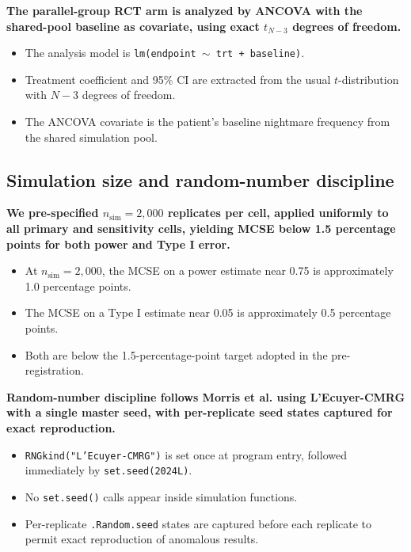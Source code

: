 \documentclass[
  11pt,
]{article}
\begin{document}
\textbf{The parallel-group RCT arm is analyzed by ANCOVA with the shared-pool baseline as covariate, using exact $t_{N-3}$ degrees of freedom.}

\begin{itemize}\setlength{\itemsep}{2pt}\setlength{\parskip}{0pt}
\item The analysis model is \texttt{lm(endpoint $\sim$ trt + baseline)}.
\item Treatment coefficient and 95\% CI are extracted from the usual $t$-distribution with $N - 3$ degrees of freedom.
\item The ANCOVA covariate is the patient's baseline nightmare frequency from the shared simulation pool.
\end{itemize}

\subsection{Simulation size and random-number discipline}\label{simulation-size-and-random-number-discipline}

\textbf{We pre-specified $n_{\text{sim}} = 2{,}000$ replicates per cell, applied uniformly to all primary and sensitivity cells, yielding MCSE below 1.5 percentage points for both power and Type I error.}

\begin{itemize}\setlength{\itemsep}{2pt}\setlength{\parskip}{0pt}
\item At $n_{\text{sim}} = 2{,}000$, the MCSE on a power estimate near 0.75 is approximately 1.0 percentage points.
\item The MCSE on a Type I estimate near 0.05 is approximately 0.5 percentage points.
\item Both are below the 1.5-percentage-point target adopted in the pre-registration.
\end{itemize}

\textbf{Random-number discipline follows Morris et al. using L'Ecuyer-CMRG with a single master seed, with per-replicate seed states captured for exact reproduction.}

\begin{itemize}\setlength{\itemsep}{2pt}\setlength{\parskip}{0pt}
\item \texttt{RNGkind("L'Ecuyer-CMRG")} is set once at program entry, followed immediately by \texttt{set.seed(2024L)}.
\item No \texttt{set.seed()} calls appear inside simulation functions.
\item Per-replicate \texttt{.Random.seed} states are captured before each replicate to permit exact reproduction of anomalous results.
\end{itemize}
\end{document}
